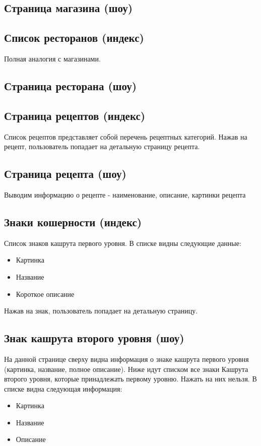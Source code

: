 \documentclass[DIV=calc, paper=a4, fontsize=11pt]{scrartcl} %
\begin{document}
\subsection{Страница магазина (шоу)}

\subsection{Список ресторанов (индекс)}
Полная аналогия с магазинами.

\subsection{Страница ресторана (шоу)}


\subsection{Страница рецептов (индекс)}
Список рецептов представляет собой перечень рецептных категорий. Нажав на рецепт, пользователь попадает на детальную страницу рецепта.

\subsection{Страница рецепта (шоу)}
Выводим информацию о рецепте - наименование, описание, картинки рецепта

\subsection{Знаки кошерности (индекс)}
Список знаков кашрута первого уровня. В списке видны следующие данные:
\begin{itemize}
	\item Картинка
	\item Название
	\item Короткое описание
\end{itemize}
Нажав на знак, пользователь попадает на детальную страницу.

\subsection{Знак кашрута второго уровня (шоу)}
На данной странице сверху видна информация о знаке кашрута первого уровня (картинка, название, полное описание). Ниже идут списком все знаки Кашрута второго уровня, которые принадлежать первому уровню. Нажать на них нельзя. В списке видна следующая информация:
\begin{itemize}
	\item Картинка
	\item Название
	\item Описание
\end{itemize}
\end{document}
